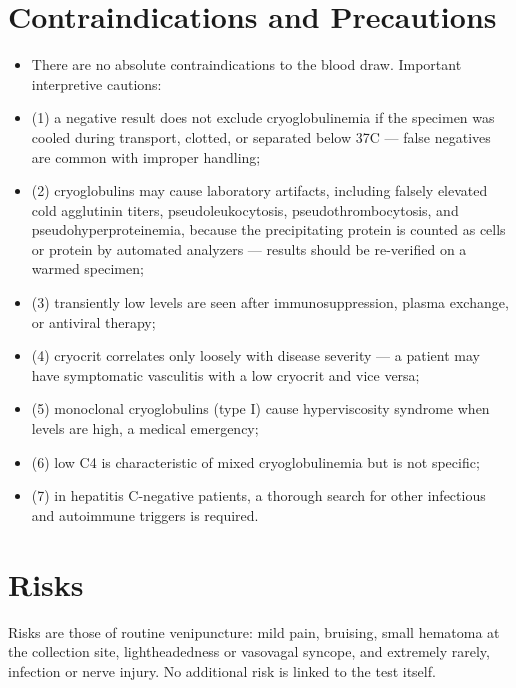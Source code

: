 \section*{Contraindications and Precautions}
\begin{itemize}
  \item There are no absolute contraindications to the blood draw. Important interpretive cautions:
  \item (1) a negative result does not exclude cryoglobulinemia if the specimen was cooled during transport, clotted, or separated below 37\textdegree{}C --- false negatives are common with improper handling;
  \item (2) cryoglobulins may cause laboratory artifacts, including falsely elevated cold agglutinin titers, pseudoleukocytosis, pseudothrombocytosis, and pseudohyperproteinemia, because the precipitating protein is counted as cells or protein by automated analyzers --- results should be re-verified on a warmed specimen;
  \item (3) transiently low levels are seen after immunosuppression, plasma exchange, or antiviral therapy;
  \item (4) cryocrit correlates only loosely with disease severity --- a patient may have symptomatic vasculitis with a low cryocrit and vice versa;
  \item (5) monoclonal cryoglobulins (type I) cause hyperviscosity syndrome when levels are high, a medical emergency;
  \item (6) low C4 is characteristic of mixed cryoglobulinemia but is not specific;
  \item (7) in hepatitis C-negative patients, a thorough search for other infectious and autoimmune triggers is required.
\end{itemize}
\section*{Risks}
Risks are those of routine venipuncture: mild pain, bruising, small hematoma at the collection site, lightheadedness or vasovagal syncope, and extremely rarely, infection or nerve injury. No additional risk is linked to the test itself.

